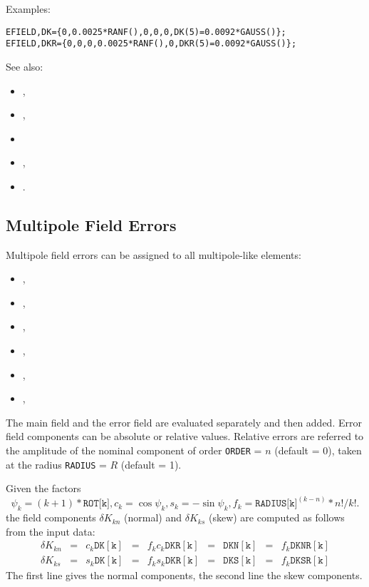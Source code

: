 Examples:
\begin{verbatim}
EFIELD,DK={0,0.0025*RANF(),0,0,0,DK(5)=0.0092*GAUSS()};
EFIELD,DKR={0,0,0,0.0025*RANF(),0,DKR(5)=0.0092*GAUSS()};
\end{verbatim}
See also: 
\begin{itemize}
\item {},
\item {},
\item {}
\item {},
\item {}.
\end{itemize}

\subsection{Multipole Field Errors}
\label{sec:errormulti}
Multipole field errors can be assigned to all multipole-like elements:
\begin{itemize}
\item {},
\item {},
\item {},
\item {},
\item {},
\item {},
\end{itemize}
The main field and the error field are evaluated separately and then added.
Error field components can be absolute or relative values.
Relative errors are referred to the amplitude of the nominal component 
of order \texttt{ORDER} = $n$ (default = 0), 
taken at the radius \texttt{RADIUS} = $R$ (default = 1).

Given the factors
\[
\psi_k = (k + 1) * \texttt{ROT[k]}, 
c_k = \cos \psi_k, 
s_k = - \sin \psi_k, 
f_k = \texttt{RADIUS[k]}^(k-n) * n! / k!.
\]
the field components 
$\delta K_{kn}$ (normal) and $\delta K_{ks}$ (skew) 
are computed as follows from the input data:
\[
\begin{array}{lclclclcl}
  \delta K_{kn} &=& c_k \mathtt{DK[k]} &=& f_k c_k \mathtt{DKR[k]} &=&
  \mathtt{DKN[k]} &=& f_k \mathtt{DKNR[k]} \\
  \delta K_{ks} &=& s_k \mathtt{DK[k]} &=& f_k s_k \mathtt{DKR[k]} &=&
  \mathtt{DKS[k]} &=& f_k \mathtt{DKSR[k]}
\end{array}
\]
The first line gives the normal components, 
the second line the skew components.

